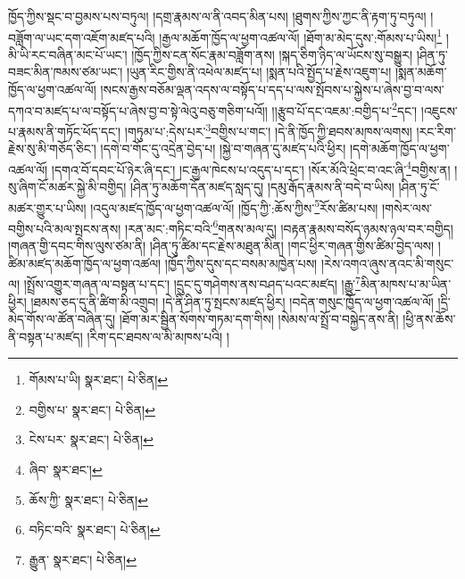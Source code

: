 ཁྱོད་ཀྱིས་སྡང་བ་བྱམས་པས་བཏུལ། །དགྲ་རྣམས་ལ་ནི་འབད་མིན་པས། །ཐུགས་ཀྱིས་ཀྱང་ནི་རྟག་ཏུ་བཏུལ། །བཟློག་ལ་ཡང་དག་འཇོག་མཛད་པའི། །རྒྱལ་མཆོག་ཁྱོད་ལ་ཕྱག་འཚལ་ལོ། །ཐོག་མ་མེད་དུས་:གོམས་པ་ཡིས།\footnote{གོམས་པ་ཡི།  སྣར་ཐང་།  པེ་ཅིན། } །མི་ཡི་རང་བཞིན་མང་པོ་ཡང་། །ཁྱོད་ཀྱིས་ངན་སོང་རྣམ་བཟློག་ནས། །སྐད་ཅིག་ཉིད་ལ་ཡོངས་སུ་བསྒྱུར། །ཤིན་ཏུ་བཟང་མིན་ཁམས་ཙམ་ཡང་། །ཡུན་རིང་གྱིས་ནི་འཕེལ་མཛད་པ། །སྨན་པའི་སྤྱོད་པ་རྗེས་འཇུག་པ། །སྨན་མཆོག་ཁྱོད་ལ་ཕྱག་འཚལ་ལོ། །སངས་རྒྱས་བཅོམ་ལྡན་འདས་ལ་བསྟོད་པ་དད་པ་ལས་སྤོབས་པ་སྐྱེས་པ་ཞེས་བྱ་བ་ལས་དཀའ་བ་མཛད་པ་ལ་བསྟོད་པ་ཞེས་བྱ་བ་སྟེ་ལེའུ་བཅུ་གཅིག་པའོ།། །།རྩུབ་པོ་དང་འཇམ་:བགྱིད་པ་\footnote{བགྱིས་པ་  སྣར་ཐང་།  པེ་ཅིན། }དང་། །འཇུངས་པ་རྣམས་ནི་གཏོང་ཕོད་དང་། །གཏུམ་པ་:དེས་པར་\footnote{ངེས་པར་  སྣར་ཐང་།  པེ་ཅིན། }བགྱིས་པ་གང་། །དེ་ནི་ཁྱོད་ཀྱི་ཐབས་མཁས་ལགས། །རང་རིག་རྗེས་སུ་མི་གཅོད་ཅིང་། །དགེ་བ་གོང་དུ་འདྲེན་བྱེད་པ། །སྐྱེ་བ་གཞན་དུ་མཛད་པའི་ཕྱིར། །དགེ་མཆོག་ཁྱོད་ལ་ཕྱག་འཚལ་ལོ། །དགའ་བོ་དབང་པོ་ཉེར་ཞི་དང་། །ང་རྒྱལ་ཁེངས་པ་འདུད་པ་དང་། །སོར་མོའི་ཕྲེང་བ་འང་ཞི་\footnote{ཞིབ་  སྣར་ཐང་། }བགྱིས་ན། །སུ་ཞིག་ངོ་མཚར་སྐྱེ་མི་བགྱིད། །ཤིན་ཏུ་མཆོག་དོན་མཛད་སླད་དུ། །དམུ་རྒོད་རྣམས་ནི་བདེ་བ་ཡིས། །ཤིན་ཏུ་ངོ་མཚར་གྱུར་པ་ཡིས། །འདུལ་མཛད་ཁྱོད་ལ་ཕྱག་འཚལ་ལོ། །ཁྱོད་ཀྱི་:ཆོས་ཀྱིས་\footnote{ཆོས་ཀྱི་  སྣར་ཐང་།  པེ་ཅིན། }རོས་ཚིམ་པས། །གསེར་ལས་བགྱིས་པའི་མལ་སྤངས་ནས། །རན་མང་:གཏིང་བའི་\footnote{བཏིང་བའི་  སྣར་ཐང་།  པེ་ཅིན། }གནས་མལ་དུ། །བརྟན་རྣམས་བསོད་ཉམས་ཉལ་བར་བགྱིད། །གཞན་གྱི་དབང་གིས་ལུས་ཙམ་ནི། །ཤིན་ཏུ་ཚིམ་དང་རྗེས་མཐུན་མིན། །གང་ཕྱིར་གཞན་གྱིས་ཚིམ་བྱེད་ལས། །ཚིམ་མཛད་མཆོག་ཁྱོད་ལ་ཕྱག་འཚལ། །ཁྱོད་ཀྱིས་དུས་དང་བསམ་མཁྱེན་པས། །རེས་འགའ་ཞུས་ནའང་མི་གསུང་ལ། །སྤྲོས་འགྱུར་གཞན་ལ་བསྟན་པ་དང་། །དྲུང་དུ་གཤེགས་ནས་བཤད་པའང་མཛད། །རྒྱུ་\footnote{རྒྱུན་  སྣར་ཐང་།  པེ་ཅིན། }མིན་མཁས་པ་མ་ཡིན་ཕྱིར། །ཐམས་ཅད་དུ་ནི་ཚིག་མི་འགྲུབ། །དེ་ནི་ཤིན་ཏུ་སྤངས་མཛད་ཕྱིར། །བདེན་གསུང་ཁྱོད་ལ་ཕྱག་འཚལ་ལོ། །དྲི་མེད་གོས་ལ་ཚོན་བཞིན་དུ། །ཐོག་མར་སྦྱིན་སོགས་གཏམ་དག་གིས། །སེམས་ལ་སྤྲོ་བ་བསྐྱེད་ནས་ནི། །ཕྱི་ནས་ཆོས་ནི་བསྟན་པ་མཛད། །རིག་དང་ཐབས་ལ་མི་མཁས་པའི། །
